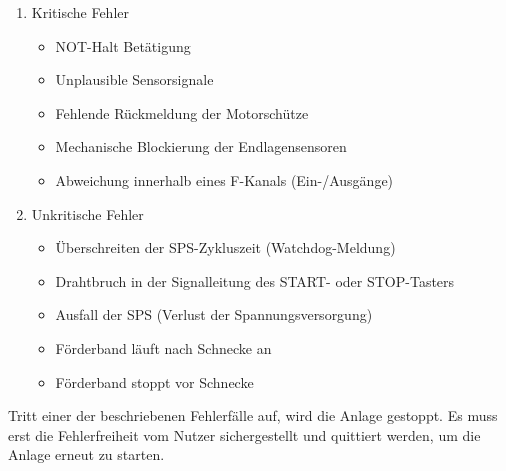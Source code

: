 \begin{enumerate}
    \item Kritische Fehler
    \begin{itemize}
        \item NOT-Halt Betätigung
        \item Unplausible Sensorsignale
        \item Fehlende Rückmeldung der Motorschütze
        \item Mechanische Blockierung der Endlagensensoren
        \item Abweichung innerhalb eines F-Kanals (Ein-/Ausgänge)
    \end{itemize}
    \item Unkritische Fehler
    \begin{itemize}
        \item Überschreiten der SPS-Zykluszeit (Watchdog-Meldung)
        \item Drahtbruch in der Signalleitung des START- oder STOP-Tasters
        \item Ausfall der SPS (Verlust der Spannungsversorgung)
        \item Förderband läuft nach Schnecke an
        \item Förderband stoppt vor Schnecke
    \end{itemize}
\end{enumerate}

Tritt einer der beschriebenen Fehlerfälle auf, wird die Anlage gestoppt. Es muss erst die Fehlerfreiheit vom Nutzer sichergestellt und quittiert werden, um die Anlage erneut zu starten.